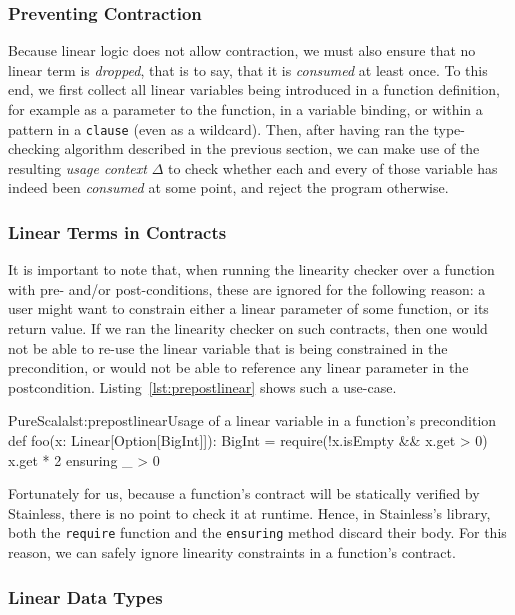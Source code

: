 \documentclass[a4paper,twoside]{article}
\newcommand{\RefCode}[1]{Listing~\ref{#1}}
\newcommand{\stt}[1]{\texttt{\small{#1}}}
\begin{document}
\subsubsection{Preventing Contraction}

Because linear logic does not allow contraction, we must also ensure that no linear term is \textit{dropped}, that is to say, that it is \textit{consumed} at least once. To this end, we first collect all linear variables being introduced in a function definition, for example as a parameter to the function, in a variable binding, or within a pattern in a \texttt{clause} (even as a wildcard). Then, after having ran the type-checking algorithm described in the previous section, we can make use of the resulting \textit{usage context} $\Delta$ to check whether each and every of those variable has indeed been \textit{consumed} at some point, and reject the program otherwise.

\subsubsection{Linear Terms in Contracts}

It is important to note that, when running the linearity checker over a function with pre- and/or post-conditions, these are ignored for the following reason: a user might want to constrain either a linear parameter of some function, or its return value. If we ran the linearity checker on such contracts, then one would not be able to re-use the linear variable that is being constrained in the precondition, or would not be able to reference any linear parameter in the postcondition. \RefCode{lst:prepostlinear} shows such a use-case.

\begin{Code}{PureScala}{lst:prepostlinear}{Usage of a linear variable in a function's precondition}
def foo(x: Linear[Option[BigInt]]): BigInt = {
  require(!x.isEmpty && x.get > 0)
  x.get * 2
} ensuring { _ > 0 }
\end{Code}

Fortunately for us, because a function's contract will be statically verified by Stainless, there is no point to check it at runtime. Hence, in Stainless's library, both the \stt{require} function and the \stt{ensuring} method discard their body. For this reason, we can safely ignore linearity constraints in a function's contract.\\

\subsubsection{Linear Data Types}
\end{document}
